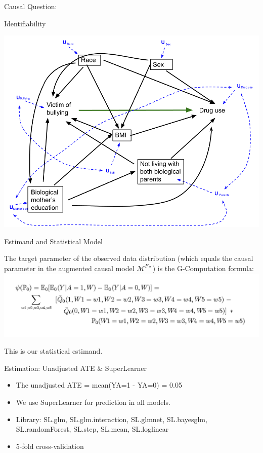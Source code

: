 \documentclass[ignorenonframetext,]{beamer}
\begin{document}
\begin{frame}{Causal Question:}
\begin{block}{Identifiability}

\includegraphics[width=1\linewidth]{DAG Causal Final Project_reduced covariates with Us_final}

\end{block}

\begin{block}{Estimand and Statistical Model}

The target parameter of the observed data distribution (which equals the
causal parameter in the augmented causal model \(\mathcal{M}^{F\star}\))
is the G-Computation formula: \includegraphics{estimand.png}

This is our statistical estimand.

\end{block}

\begin{block}{Estimation: Unadjusted ATE \& SuperLearner}

\begin{itemize}
\item
  The unadjusted ATE = mean(Y\textbar{}A=1 - Y\textbar{}A=0) = 0.05
\item
  We use SuperLearner for prediction in all models.
\item
  Library: SL.glm, SL.glm.interaction, SL.glmnet, SL.bayesglm,
  SL.randomForest, SL.step, SL.mean, SL.loglinear
\item
  5-fold cross-validation
\end{itemize}


\end{block}
\end{frame}
\end{document}
